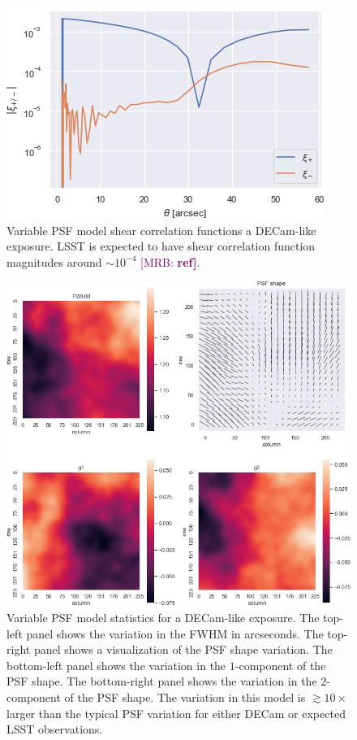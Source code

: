 \documentclass[fleqn,useAMS,usenatbib]{mnras}
\newcommand{\mrb}[1]{\textcolor{purple}{[MRB: \bf #1]}}
\begin{document}
\begin{figure}
  \includegraphics[width=\columnwidth]{figures/psxi.png}
  \caption{
    Variable PSF model shear correlation functions a DECam-like exposure. LSST
    is expected to have shear correlation function magnitudes around
    $\sim10^{-4}$ \mrb{ref}.
    \label{fig:psxi}}
\end{figure}

\begin{figure}
  \includegraphics[width=\textwidth]{figures/pspsf.png}
  \caption{
    Variable PSF model statistics for a DECam-like exposure. The top-left
    panel shows the variation in the FWHM in arcseconds. The top-right panel
    shows a visualization of the PSF shape variation. The bottom-left panel shows
    the variation in the $1$-component of the PSF shape. The bottom-right panel
    shows the variation in the $2$-component of the PSF shape. The variation in
    this model is $\gtrsim10\times$ larger than the typical PSF variation for
    either DECam or expected LSST observations.
    \label{fig:pspsf}}
\end{figure}

\bsp
\label{lastpage}
\end{document}
